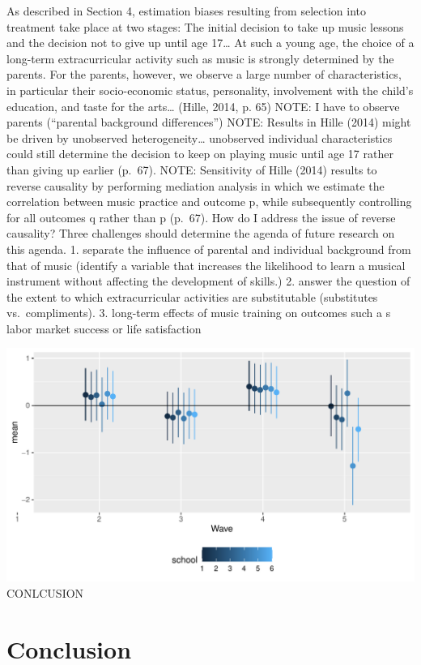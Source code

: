 \documentclass[a4, 12pt]{article}
\begin{document}
As described in Section 4, estimation biases resulting from selection into treatment take place at two stages: The initial decision to take up music lessons and the decision not to give up until age 17\ldots{} At such a young age, the choice of a long-term extracurricular activity such as music is strongly determined by the parents. For the parents, however, we observe a large number of characteristics, in particular their socio-economic status, personality, involvement with the child's education, and taste for the arts\ldots{} (Hille, 2014, p. 65)
NOTE: I have to observe parents (``parental background differences'')
NOTE: Results in Hille (2014) might be driven by unobserved heterogeneity\ldots{} unobserved individual characteristics could still determine the decision to keep on playing music until age 17 rather than giving up earlier (p.~67).
NOTE: Sensitivity of Hille (2014) results to reverse causality by performing mediation analysis in which we estimate the correlation between music practice and outcome p, while subsequently controlling for all outcomes q rather than p (p.~67). How do I address the issue of reverse causality?
Three challenges should determine the agenda of future research on this agenda.
1. separate the influence of parental and individual background from that of music (identify a variable that increases the likelihood to learn a musical instrument without affecting the development of skills.)
2. answer the question of the extent to which extracurricular activities are substitutable (substitutes vs.~compliments).
3. long-term effects of music training on outcomes such a s labor market success or life satisfaction

\includegraphics[width=1\linewidth]{../figures/lsat_teff_across_schools}
CONLCUSION
\clearpage

\hypertarget{conclusion}{%
\section{Conclusion}\label{conclusion}}
\end{document}

